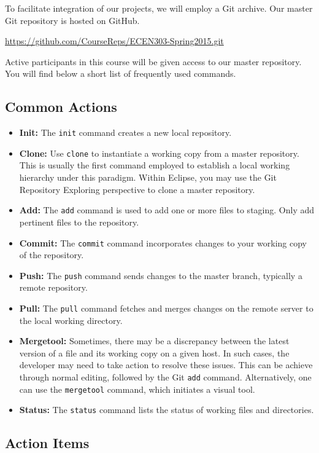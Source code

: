 \documentclass[11pt]{article}
\begin{document}
To facilitate integration of our projects, we will employ a Git archive.
Our master Git repository is hosted on GitHub.
\begin{center}
\url{https://github.com/CourseReps/ECEN303-Spring2015.git}
\end{center}
Active participants in this course will be given access to our master repository.
You will find below a short list of frequently used commands.


\subsection*{Common Actions}

\begin{itemize}
\item \textbf{Init:}
The \texttt{init} command creates a new local repository.
\item \textbf{Clone:}
Use \texttt{clone} to instantiate a working copy from a master repository.
This is usually the first command employed to establish a local working hierarchy under this paradigm.
Within Eclipse, you may use the Git Repository Exploring perspective to clone a master repository.
\item \textbf{Add:}
The \texttt{add} command is used to add one or more files to staging.
Only add pertinent files to the repository.
\item \textbf{Commit:}
The \texttt{commit} command incorporates changes to your working copy of the repository.
\item \textbf{Push:}
The \texttt{push} command sends changes to the master branch, typically a remote repository.
\item \textbf{Pull:}
The \texttt{pull} command fetches and merges changes on the remote server to the local working directory.
\item \textbf{Mergetool:}
Sometimes, there may be a discrepancy between the latest version of a file and its working copy on a given host.
In such cases, the developer may need to take action to resolve these issues.
This can be achieve through normal editing, followed by the Git \texttt{add} command.
Alternatively, one can use the  \texttt{mergetool} command, which initiates a visual tool.
\item \textbf{Status:}
The \texttt{status} command lists the status of working files and directories.
\end{itemize}


\subsection*{Action Items}
\end{document}

